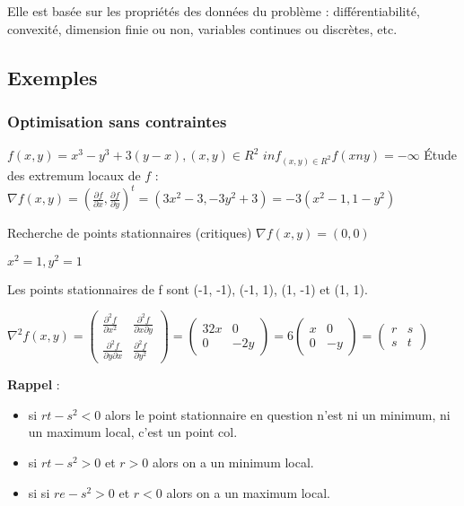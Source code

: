 	Elle est basée sur les propriétés des données du problème : différentiabilité, convexité, dimension finie ou non, variables continues ou discrètes, etc.
	
	
	\subsection{Exemples}
	
		\subsubsection{Optimisation sans contraintes}
		
	$f(x, y) = x^3 - y^3 + 3(y-x), (x, y) \in R^2$
	$inf_{(x, y) \in R^2} f(xn y) = -\infty$
	Étude des extremum locaux de $f$ :
	$\nabla f(x, y) = (\frac{\partial f}{\partial x}, \frac{\partial f}{\partial y})^t = (3x^2-3, -3y^2 +3)=-3(x^2-1 , 1-y^2)$
	
	Recherche de points stationnaires (critiques) $\nabla f(x, y) = ( 0, 0)$
	
	$ x^2 = 1 , y^2 = 1$
	
	Les points stationnaires de f sont (-1, -1), (-1, 1), (1, -1) et (1, 1).
	
	$\nabla^2 f(x, y) = \begin{pmatrix} \frac{\partial^2 f}{\partial x^2} &\frac{\partial^2 f}{\partial x \partial y} \\ \frac{\partial^2 f}{\partial y \partial x} & \frac{\partial^2 f}{\partial y^2} \end{pmatrix} 
	= \begin{pmatrix} 32x & 0 \\ 0 & -2y \end{pmatrix}
	= 6\begin{pmatrix} x & 0 \\ 0 & -y\end{pmatrix} 
	= \begin{pmatrix} r & s \\ s & t\end{pmatrix}$

	
	\textbf{Rappel} :
	\begin{itemize}
		\item si $rt-s^2 <0$ alors le point stationnaire en question n'est ni un minimum, ni un maximum local, c'est un point \og col\fg.
		\item si $rt -s^2 >0$ et $r>0$ alors on a un minimum local. 
		\item si si $re -s^2 >0$ et $r<0$ alors on a un maximum local.
	\end{itemize}
	
